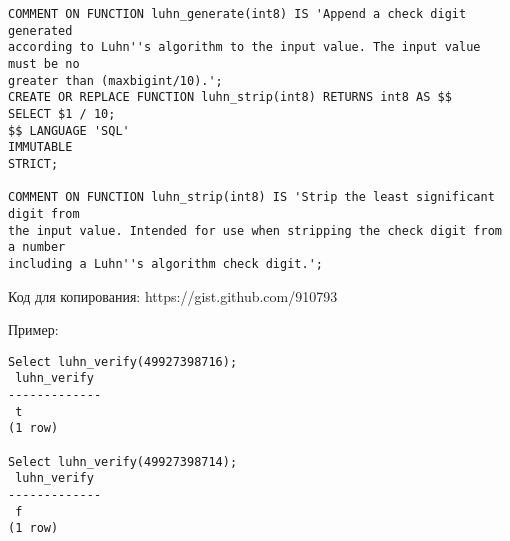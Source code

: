 \begin{lstlisting}[label=lst:snippets10,caption=Алгоритм Луна. SQL запрос]
COMMENT ON FUNCTION luhn_generate(int8) IS 'Append a check digit generated
according to Luhn''s algorithm to the input value. The input value must be no
greater than (maxbigint/10).';
CREATE OR REPLACE FUNCTION luhn_strip(int8) RETURNS int8 AS $$
SELECT $1 / 10;
$$ LANGUAGE 'SQL'
IMMUTABLE
STRICT;
 
COMMENT ON FUNCTION luhn_strip(int8) IS 'Strip the least significant digit from
the input value. Intended for use when stripping the check digit from a number
including a Luhn''s algorithm check digit.';
\end{lstlisting}

Код для копирования: https://gist.github.com/910793

Пример:
\begin{lstlisting}[label=lst:snippets11,caption=Алгоритм Луна. Пример]
Select luhn_verify(49927398716);
 luhn_verify 
-------------
 t
(1 row)

Select luhn_verify(49927398714);
 luhn_verify 
-------------
 f
(1 row)

\end{lstlisting}